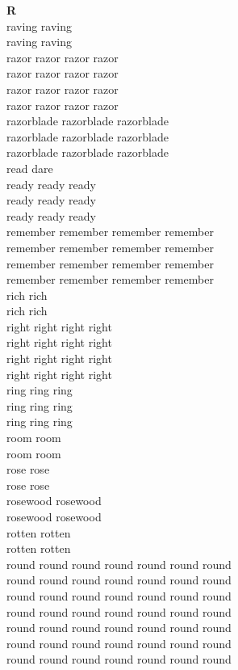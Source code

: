 \vspace{14pt}
\noindent\textbf{\Large R}\\[+12pt]
raving raving\\
raving raving\\
razor razor razor razor\\
razor razor razor razor\\
razor razor razor razor\\
razor razor razor razor\\
razorblade razorblade razorblade\\
razorblade razorblade razorblade\\
razorblade razorblade razorblade\\
read dare\\
ready ready ready\\
ready ready ready\\
ready ready ready\\
remember remember remember remember\\
remember remember remember remember\\
remember remember remember remember\\
remember remember remember remember\\
rich rich\\
rich rich\\
right right right right\\
right right right right\\
right right right right\\
right right right right\\
ring ring ring\\
ring ring ring\\
ring ring ring\\
room room\\
room room\\
rose rose\\
rose rose\\
rosewood rosewood\\
rosewood rosewood\\
rotten rotten\\
rotten rotten\\
round round round round round round round\\
round round round round round round round\\
round round round round round round round\\
round round round round round round round\\
round round round round round round round\\
round round round round round round round\\
round round round round round round round\\



